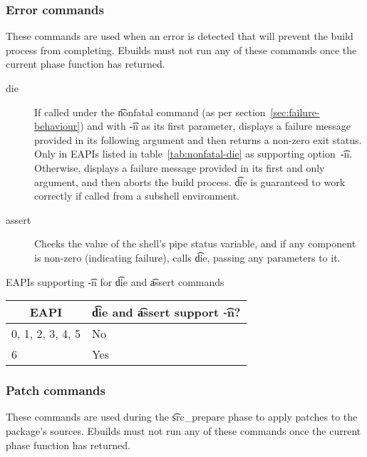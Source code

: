 \subsubsection{Error commands}
These commands are used when an error is detected that will prevent the build process from
completing. Ebuilds must not run any of these commands once the current phase function has returned.
\begin{description}
\item[die]  If called under the \t{nonfatal} command (as per
    section~\ref{sec:failure-behaviour}) and with \t{-n} as its first parameter, displays a failure
    message provided in its following argument and then returns a non-zero exit status. Only in
    EAPIs listed in table~\ref{tab:nonfatal-die} as supporting option~\t{-n}. Otherwise, displays
    a failure message provided in its first and only argument, and then aborts the build process.
    \t{die} is  guaranteed to work correctly if called from a subshell environment.
\item[assert] Checks the value of the shell's pipe status variable, and if any component is non-zero
    (indicating failure), calls \t{die}, passing any parameters to it.
\end{description}

\begin{centertable}{EAPIs supporting \t{-n} for \t{die} and \t{assert} commands}
    \label{tab:nonfatal-die}
    \begin{tabular}{ll}
      \toprule
      \multicolumn{1}{c}{\textbf{EAPI}} &
      \multicolumn{1}{c}{\textbf{\t{die} and \t{assert} support \t{-n}?}} \\
      \midrule
      0, 1, 2, 3, 4, 5  & No  \\
      6                 & Yes \\
      \bottomrule
    \end{tabular}
\end{centertable}

\subsubsection{Patch commands}
These commands are used during the \t{src\_prepare} phase to apply patches to the package's sources.
Ebuilds must not run any of these commands once the current phase function has returned.

